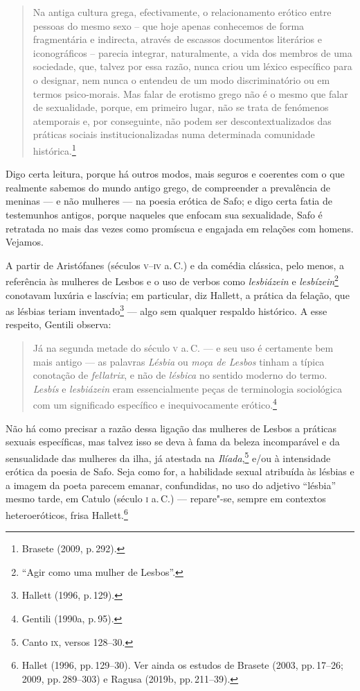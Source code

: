 \begin{quote}
Na antiga cultura grega, efectivamente, o relacionamento erótico entre pessoas do mesmo sexo – que hoje apenas conhecemos de forma fragmentária e indirecta, através de escassos documentos literários e iconográficos – parecia integrar, naturalmente, a vida dos membros de uma sociedade, que, talvez por essa razão, nunca criou um léxico específico para o designar, nem nunca o entendeu de um modo discriminatório ou em termos psico-morais. Mas falar de erotismo grego não é o mesmo que falar de sexualidade, porque, em primeiro lugar, não se trata de fenómenos atemporais e, por conseguinte, não podem ser descontextualizados das práticas sociais institucionalizadas numa determinada comunidade histórica.\footnote{Brasete (2009, p.\,292).}
\end{quote}


Digo certa leitura, porque há outros modos, mais
 seguros e coerentes com o que realmente sabemos do mundo antigo grego, de
 compreender a prevalência de meninas --- e não mulheres ---  na poesia erótica de Safo; e digo
 certa fatia de testemunhos antigos, porque naqueles que enfocam sua
 sexualidade, Safo é retratada no mais das vezes como promíscua e engajada em relações com homens. Vejamos.

A partir de Aristófanes (séculos \textsc{v}--\textsc{iv} a.\,C.) e da comédia clássica, pelo menos, a
referência às mulheres de Lesbos e o uso de verbos como \emph{lesbiázein} e
\emph{lesbízein}\footnote{``Agir como uma mulher de Lesbos''.} conotavam luxúria e
lascívia; em particular, diz Hallett, a prática da
felação, que as lésbias teriam inventado\footnote{ Hallett (1996, p.\,129).} --- algo sem qualquer respaldo
histórico. A esse respeito, Gentili observa: 

\begin{quote}
Já na segunda metade do século \textsc{v} a.\,C. --- e seu uso é certamente bem mais antigo
--- as palavras \emph{Lésbia} ou \emph{moça de Lesbos} tinham a típica
conotação de \emph{fellatrix}, e não de \emph{lésbica} no sentido moderno
do termo. \emph{Lesbís} e \emph{lesbiázein} eram essencialmente peças de
terminologia sociológica com um significado específico e inequivocamente
erótico.\footnote{ Gentili (1990a, p.\,95).}
\end{quote}

Não há como precisar a razão dessa ligação das mulheres de Lesbos a práticas
sexuais específicas, mas talvez isso se deva à fama da beleza incomparável e da
sensualidade das mulheres da ilha, já atestada na \emph{Ilíada},\footnote{Canto \textsc{ix}, versos 128--30.}
e/ou à intensidade erótica da poesia de Safo. Seja como for, a habilidade
sexual atribuída às lésbias e a imagem da poeta parecem
emanar, confundidas, no uso do adjetivo “lésbia” mesmo tarde, em Catulo
(século \textsc{i} a.\,C.) --- repare"-se, sempre em contextos heteroeróticos, frisa Hallett.\footnote{ Hallet 
(1996, pp.\,129--30). Ver ainda os estudos de Brasete (2003, pp.\,17--26; 2009, pp.\,289--303) e Ragusa (2019b, pp.\,211--39).} 

